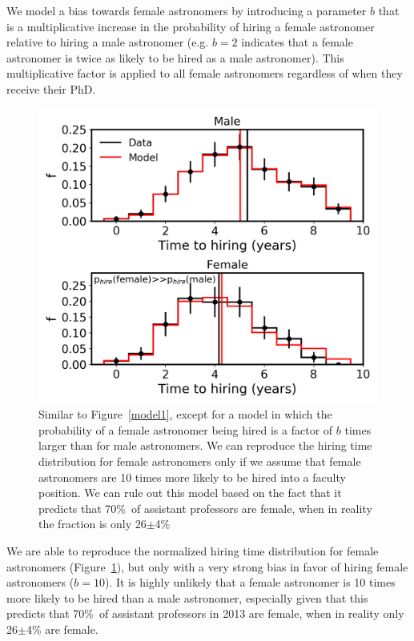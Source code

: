 \documentclass[modern]{aastex62}
\begin{document}
We model a bias towards female astronomers by introducing a parameter $b$ that is a multiplicative increase in the probability of hiring a female astronomer relative to hiring a male astronomer (e.g. $b=2$ indicates that a female astronomer is twice as likely to be hired as a male astronomer). This multiplicative factor is applied to all female astronomers regardless of when they receive their PhD. 

\begin{figure}[!hbt]
\center
\includegraphics[scale=.6]{model2_b10.png}
\caption{Similar to Figure~\ref{model1}, except for a model in which the probability of a female astronomer being hired is a factor of $b$ times larger than for male astronomers. We can reproduce the hiring time distribution for female astronomers only if we assume that female astronomers are 10 times more likely to be hired into a faculty position. We can rule out this model based on the fact that it predicts that 70\%\ of assistant professors are female, when in reality the fraction is only 26$\pm$4\% \citep{hug14} \label{model2_b10}}
\end{figure}

We are able to reproduce the normalized hiring time distribution for female astronomers (Figure~\ref{model2_b10}), but only with a very strong bias in favor of hiring female astronomers ($b=10$). It is highly unlikely that a female astronomer is 10 times more likely to be hired than a male astronomer, especially given that this predicts that 70\%\ of assistant professors in 2013 are female, when in reality only 26$\pm$4\% are female. 
\end{document}
